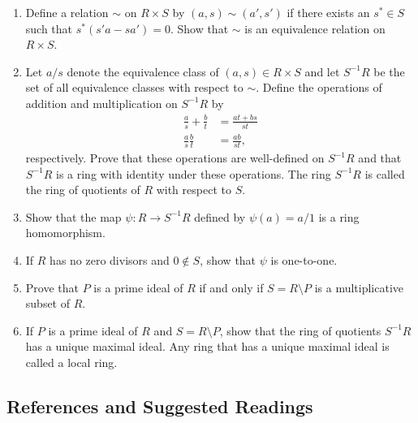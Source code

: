 {\begin{enumerate}
\begin{enumerate}
 \item
Define a relation $\sim$ on $R \times S$ by $(a, s) \sim (a', s')$ if
there exists an $s^\ast \in S$ such that $s^\ast(s' a -s a') =0$. Show that
$\sim$ is an equivalence relation on $R \times S$.
 
 
 \item
Let $a/s$ denote the equivalence class of $(a,s) \in R \times S$ and
let $ S^{-1}R$ be the set of all equivalence classes with respect to
$\sim$.  Define  the operations of addition and multiplication on
$S^{-1} R$ by
\begin{align*}
\frac{a}{s} + \frac{b}{t} & = \frac{at + b s}{s t} \\
\frac{a}{s}  \frac{b}{t} & = \frac{a b}{s t},
\end{align*}
respectively. Prove that these operations are well-defined on $S^{-1}R$
and that $S^{-1}R$ is a ring with identity under these operations.
The ring $S^{-1}R$ is called the {\bfi ring of
quotients\/} of $R$ with respect to $S$.


 
 \item
Show that the map $\psi : R \rightarrow S^{-1}R$ defined by $\psi(a)
= a/1$ is a ring homomorphism.
 
 \item
If $R$ has no zero divisors and $0 \notin S$, show that $\psi$ is
one-to-one.
 
 
\item
Prove that $P$ is a prime ideal of $R$ if and only if $S = R \setminus
P$ is a multiplicative subset of $R$. 
 
\item
If $P$ is a prime ideal of $R$ and $S = R \setminus P$, show that the
ring of quotients $S^{-1}R$ has a unique maximal ideal. Any ring
that has a unique maximal ideal is called a {\bfi local
ring}.  
 
 
\end{enumerate}



 
\end{enumerate}
}
 
 
 
\subsection*{References and Suggested Readings}
 
